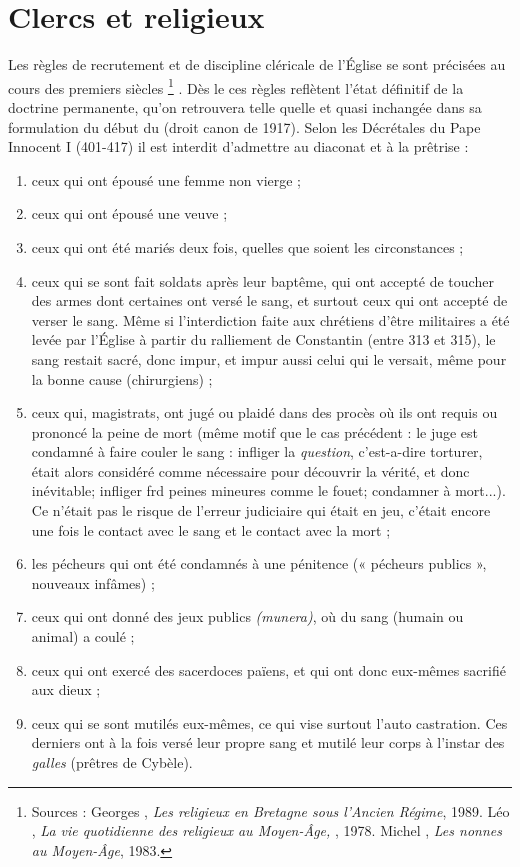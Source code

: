 
\chapter{Clercs et religieux}


 Les règles de recrutement et de discipline cléricale de l'Église se sont précisées au cours des premiers siècles%
\footnote{Sources : Georges , \emph{Les religieux en Bretagne sous l'Ancien Régime}, 1989. Léo , \emph{La vie quotidienne des religieux au Moyen-Âge, }, 1978. Michel , \emph{Les nonnes au Moyen-Âge}, 1983.}%
. Dès le  ces règles reflètent l'état définitif de la doctrine permanente, qu'on retrouvera telle quelle et quasi inchangée dans sa formulation du début du  (droit canon de 1917). Selon les Décrétales du Pape Innocent I (401-417) il est interdit d'admettre au diaconat et à la prêtrise :
\begin{enumerate}
\item ceux qui ont épousé une femme non vierge ;
\item ceux qui ont épousé une veuve ;
\item ceux qui ont été mariés deux fois, quelles que soient les circonstances ;
\item ceux qui se sont fait soldats après leur baptême, qui ont accepté de toucher des armes dont certaines ont versé le sang, et surtout ceux qui ont accepté de verser le sang. Même si l'interdiction faite aux chrétiens d'être militaires a été levée par l'Église à partir du ralliement de Constantin (entre 313 et 315), le sang restait sacré, donc impur, et impur aussi celui qui le versait, même pour la bonne cause (chirurgiens) ;
\item ceux qui, magistrats, ont jugé ou plaidé dans des procès où ils ont requis ou prononcé la peine de mort (même motif que le cas précédent : le juge est condamné à faire couler le sang : infliger la \emph{question}, c'est-a-dire torturer, était alors considéré comme nécessaire pour découvrir la vérité, et donc inévitable; infliger frd peines mineures comme le fouet; condamner à mort...). Ce n'était pas le risque de l'erreur judiciaire qui était en jeu, c'était encore une fois le contact avec le sang et le contact avec la mort ;
\item les pécheurs qui ont été condamnés à une pénitence (« pécheurs publics », nouveaux infâmes) ;
\item ceux qui ont donné des jeux publics \emph{(munera)}, où du sang (humain ou animal) a coulé ;
\item ceux qui ont exercé des sacerdoces païens, et qui ont donc eux-mêmes sacrifié aux dieux ;
\item ceux qui se sont mutilés eux-mêmes, ce qui vise surtout l'auto castration. Ces derniers ont à la fois versé leur propre sang et mutilé leur corps à l'instar des \emph{galles} (prêtres de Cybèle).
\end{enumerate}

